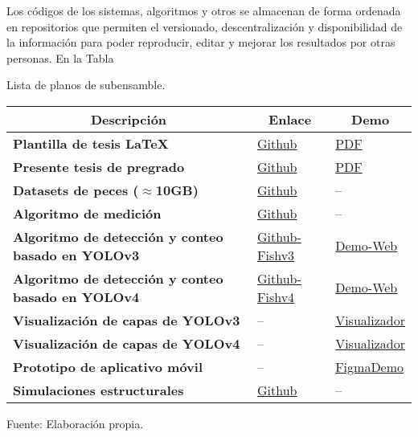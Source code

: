 Los códigos de los sistemas, algoritmos y otros se almacenan de forma ordenada en repositorios que permiten el versionado, descentralización y disponibilidad de la información para poder reproducir, editar y mejorar los resultados por otras personas. En la Tabla

\begin{mytable}[H]
	\footnotesize\centering
	\caption{Lista de planos de subensamble.}
	\label{tab:lista de repositorios}
	\begin{tabular}{|l|l|l|}
		\hline
		\multicolumn{1}{|c|}{\textbf{Descripción}} & \multicolumn{1}{c|}{\textbf{Enlace}} & \multicolumn{1}{c|}{\textbf{Demo}} \\ \hline
		\textbf{Plantilla de tesis \LaTeX} & \href{https://github.com/ZurMaD/plantilla_tesis_pucp}{Github} & \href{https://github.com/ZurMaD/plantilla_tesis_pucp/blob/master/plantilla/main.pdf}{PDF} \\ \hline
		\textbf{Presente tesis de pregrado} & \href{https://github.com/ZurMaD/tesis_pregrado_pucp}{Github} & \href{https://github.com/ZurMaD/tesis_pregrado_pucp/blob/master/Latex/trabajo-de-investigacion-2/main.pdf}{PDF}  \\ \hline
		\textbf{Datasets de peces ($\approx$10GB)} & \href{https://github.com/DZPeru/fish-datasets}{Github} & -- \\ \hline		
		\textbf{Algoritmo de medición} & \href{https://github.com/DZPeru/fish-classifier}{Github} & --\\ \hline
		\textbf{Algoritmo de detección y conteo basado en YOLOv3} & \href{https://github.com/DZPeru/fishv3}{Github-Fishv3} & \href{https://fishv3.herokuapp.com/}{Demo-Web} \\ \hline 
		\textbf{Algoritmo de detección y conteo basado en YOLOv4} & \href{https://github.com/DZPeru/fishv4}{Github-Fishv4} & \href{https://fishv4.herokuapp.com/}{Demo-Web}\\ \hline 
		\textbf{Visualización de capas de YOLOv3} & -- & \href{https://netron.app/?url=https://raw.githubusercontent.com/DZPeru/fishv3/master/fishv3/fish_test.cfg}{Visualizador}\\ \hline 
		\textbf{Visualización de capas de YOLOv4} & -- & \href{https://netron.app/?url=https://raw.githubusercontent.com/DZPeru/fishv4/main/fishv4/fish_test.cfg}{Visualizador}\\ \hline 
		\textbf{Prototipo de aplicativo móvil} & -- & \href{https://bit.ly/3ko1nG0}{FigmaDemo}\\ \hline
		\textbf{Simulaciones estructurales} & \href{https://bit.ly/3ohX3ui}{Github} & -- \\ \hline		
	\end{tabular}
	\begin{myflushcenteraftertable}	
		Fuente: Elaboración propia.
	\end{myflushcenteraftertable}
\end{mytable}

